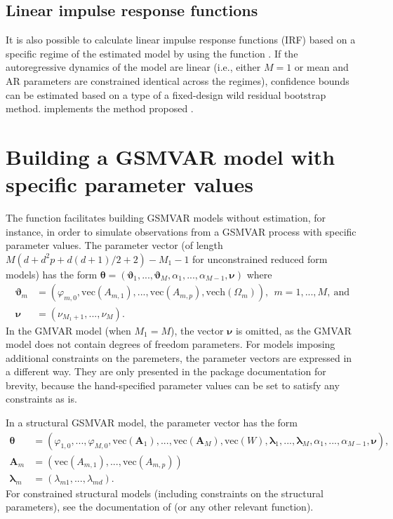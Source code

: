 \documentclass[nojss]{jss}
\begin{document}
\subsection{Linear impulse response functions}
It is also possible to calculate linear impulse response functions (IRF) based on a specific regime of the estimated model by using the function . If the autoregressive dynamics of the model are linear (i.e., either $M=1$ or mean and AR parameters are constrained identical across the regimes), confidence bounds can be estimated based on a type of a fixed-design wild residual bootstrap method.  implements the method proposed \cite{Herwartz+Lutkepohl:2014}.

\section{Building a GSMVAR model with specific parameter values}\label{sec:GSMVAR}
The function  facilitates building GSMVAR models without estimation, for instance, in order to simulate observations from a GSMVAR process with specific parameter values. The parameter vector (of length $M(d + d^2p + d(d+1)/2 + 2) - M_1 - 1$ for unconstrained reduced form models) has the form $\boldsymbol{\theta} = (\boldsymbol{\vartheta}_1,...,\boldsymbol{\vartheta}_M,\alpha_1,...,\alpha_{M-1},\boldsymbol{\nu})$ where
\begin{align}
\boldsymbol{\vartheta}_m &= (\varphi_{m,0},\text{vec}({A_{m,1}}),...,\text{vec}(A_{m,p}),\text{vech}(\Omega_m)),\ \ m=1,...,M, \ \text{and}  \\
\boldsymbol{\nu} &= (\nu_{M_1+1},...,\nu_M).
\end{align}
%
In the GMVAR model (when $M_1=M$), the vector $\boldsymbol{\nu}$ is omitted, as the GMVAR model does not contain degrees of freedom parameters. For models imposing additional constraints on the paremeters, the parameter vectors are expressed in a different way. They are only presented in the package documentation for brevity, because the hand-specified parameter values can be set to satisfy any constraints as is.

In a structural GSMVAR model, the parameter vector has the form
\begin{align}
\boldsymbol{\theta} &= (\varphi_{1,0},...,\varphi_{M,0},\text{vec}(\boldsymbol{A}_1),...,\text{vec}(\boldsymbol{A}_M),\text{vec}(W),\boldsymbol{\lambda}_1,...,\boldsymbol{\lambda}_M, \alpha_1,...,\alpha_{M-1},\boldsymbol{\nu}), \\
\boldsymbol{A}_m & = (\text{vec}({A_{m,1}}),...,\text{vec}(A_{m,p})) \\
\boldsymbol{\lambda}_m &= (\lambda_{m1},...,\lambda_{md}).
\end{align}
For constrained structural models (including constraints on the structural parameters), see the documentation of  (or any other relevant function).
\end{document}
